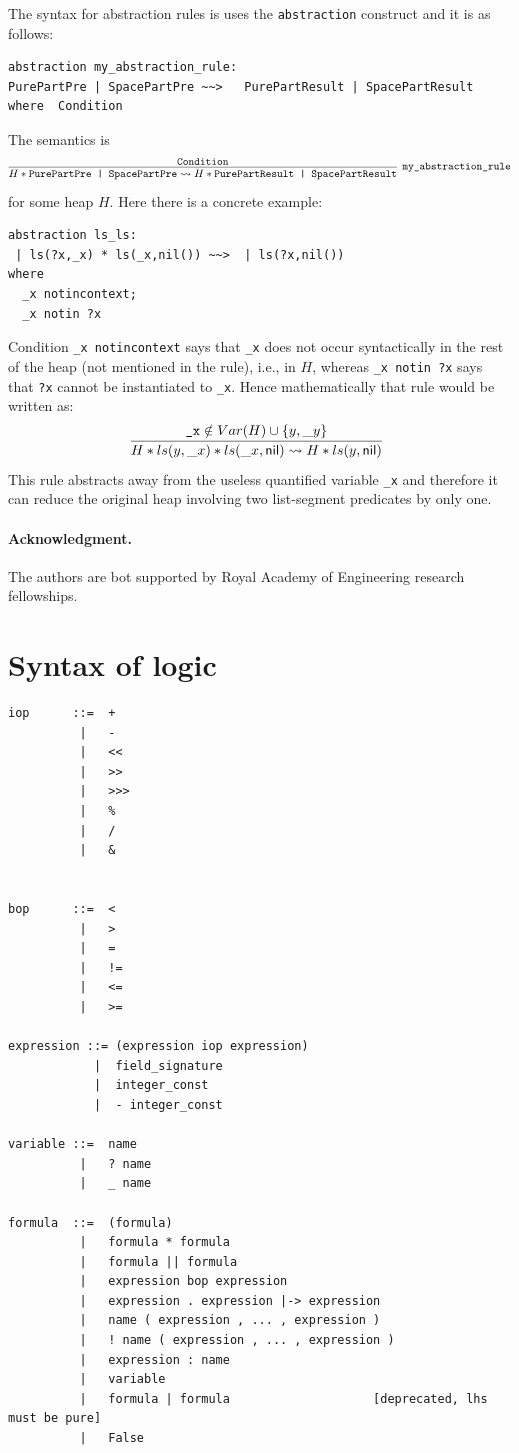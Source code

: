 \documentclass[11pt]{article}
\newcommand{\nil}{{\sf nil}}
\begin{document}
The syntax for abstraction rules is uses the {\tt abstraction} construct and it is as follows:
\begin{verbatim}
abstraction my_abstraction_rule:
PurePartPre | SpacePartPre ~~>   PurePartResult | SpacePartResult    
where  Condition
\end{verbatim}
The semantics  is
\[
\infer[\texttt{my\_abstraction\_rule}]
{H* \texttt{PurePartPre | SpacePartPre} \leadsto H*\texttt{PurePartResult | SpacePartResult} }{\texttt{Condition}}
\] for some heap $H$. Here there is a concrete example:
\begin{verbatim}
abstraction ls_ls:
 | ls(?x,_x) * ls(_x,nil()) ~~>  | ls(?x,nil())
where 
  _x notincontext;
  _x notin ?x
\end{verbatim}
Condition {\tt \_x notincontext} says that {\tt \_x} does not occur syntactically in the rest of the heap (not mentioned in the rule), i.e., in $H$, whereas {\tt \_x notin ?x} says that {\tt ?x} cannot be instantiated to {\tt \_x}. Hence mathematically that rule would be written as:
\[
\infer[]
{H*ls(y,\_x)*ls(\_x,\nil) \leadsto H*ls(y,\nil)}
{\texttt{\_x} \notin Var(H) \cup \{y,\_y \} }
\] This rule abstracts away from the useless quantified variable {\tt \_x} and therefore it can reduce the original heap involving two list-segment predicates by only one.

\paragraph{Acknowledgment.}
The authors are bot supported by Royal Academy of Engineering research fellowships.




\appendix 
\section{Syntax of logic}

\begin{verbatim}
iop      ::=  +
          |   -
          |   <<
          |   >>
          |   >>>
          |   %
          |   /
          |   &


bop      ::=  <  
          |   >
          |   =
          |   !=
          |   <=
          |   >=

expression ::= (expression iop expression)
            |  field_signature
            |  integer_const
            |  - integer_const
              
variable ::=  name
          |   ? name
          |   _ name

formula  ::=  (formula)
          |   formula * formula
          |   formula || formula
          |   expression bop expression
          |   expression . expression |-> expression
          |   name ( expression , ... , expression ) 
          |   ! name ( expression , ... , expression ) 
          |   expression : name
          |   variable
          |   formula | formula                    [deprecated, lhs must be pure]
          |   False
\end{verbatim}
\end{document}
